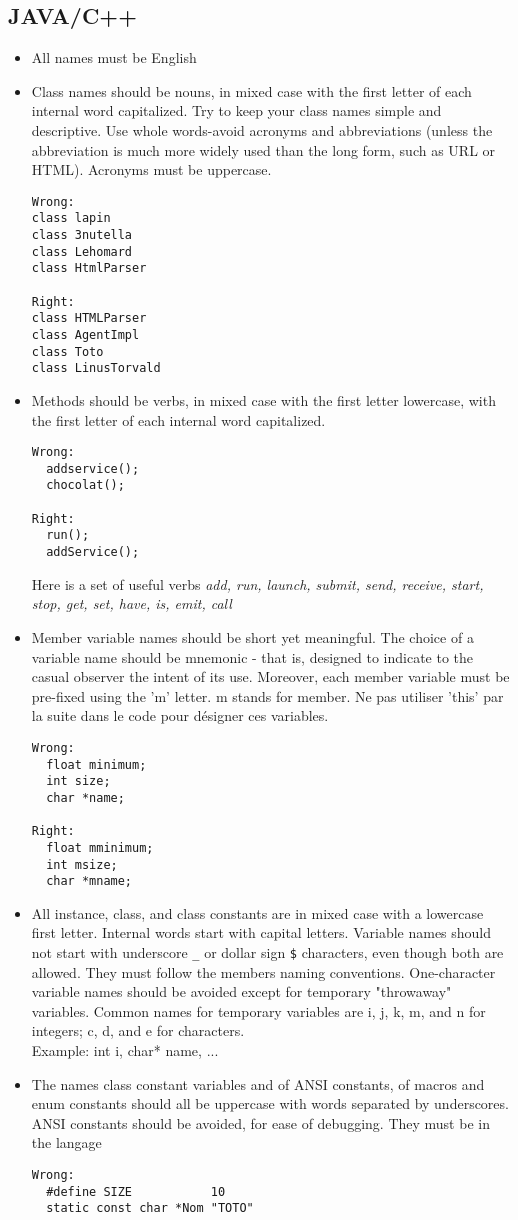 \documentclass{article}
\begin{document}
\subsection{JAVA/C++}
\begin{itemize}
\item All names must be English
\item Class names should be nouns, in mixed case with the first letter of each
 internal word capitalized. Try to keep your class names simple and descriptive.
 Use whole words-avoid acronyms and abbreviations (unless the abbreviation is
 much more widely used than the long form, such as URL or HTML). Acronyms must
be uppercase.
\begin{verbatim}
Wrong:
class lapin
class 3nutella
class Lehomard
class HtmlParser

Right:
class HTMLParser
class AgentImpl
class Toto
class LinusTorvald
\end{verbatim}

\item Methods should be verbs, in mixed case with the first letter lowercase,
 with the first letter of each internal word capitalized.
\begin{verbatim}
Wrong:
  addservice();
  chocolat();

Right:
  run();
  addService();
\end{verbatim}
Here is a set of useful verbs \textit{add, run, launch, submit, send, receive,
start, stop, get, set, have, is, emit, call}
\item Member variable names should be short yet meaningful. The choice of a
 variable name should be mnemonic - that is, designed to indicate to the
 casual observer the intent of its use. Moreover, each member
 variable must be pre-fixed using the 'm' letter. m stands for member. 
Ne pas utiliser 'this' par la suite dans le code pour désigner ces variables.
\begin{verbatim}
Wrong:
  float minimum;
  int size;
  char *name;

Right:
  float mminimum;
  int msize;
  char *mname;
\end{verbatim}
\item All instance, class, and class constants are in mixed case with a
 lowercase first letter. Internal words start with capital letters. Variable
 names should not start with underscore \texttt{\_} or dollar sign \texttt{\$}
 characters, even though both are allowed. They must follow the members naming
 conventions.
One-character variable names should be avoided except for temporary "throwaway"
 variables. Common names for temporary variables are i, j, k, m, and n for
 integers; c, d, and e for characters.\\
  Example: int i, char* name, ...
\item The names class constant variables and of ANSI constants,
 of macros and enum constants should all be uppercase with words
 separated by underscores. ANSI constants should be avoided, for ease of
 debugging. They must be in the langage
\begin{verbatim}
Wrong:
  #define SIZE           10
  static const char *Nom "TOTO"


\end{verbatim}
\end{itemize}
\end{document}
